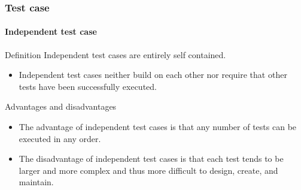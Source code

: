 \begin{frame}[hasprev=true, hasnext=false]
\label{concept:independent-test-case}
\frametitle{Test case}
\framesubtitle{Independent test case}

\begin{block:concept}{Definition}
Independent test cases are entirely self contained.
\begin{itemize}
	\item Independent test cases neither build on each other nor require that
	other tests have been successfully executed.
\end{itemize}
\end{block:concept}

\begin{block:fact}{Advantages and disadvantages}
\begin{itemize}
	\item The advantage of independent test cases is that any number of tests
	can be executed in any order.

	\item The disadvantage of independent test cases is that each test tends to
	be larger and more complex and thus more difficult to design, create, and
	maintain.
\end{itemize}
\end{block:fact}
\end{frame}
